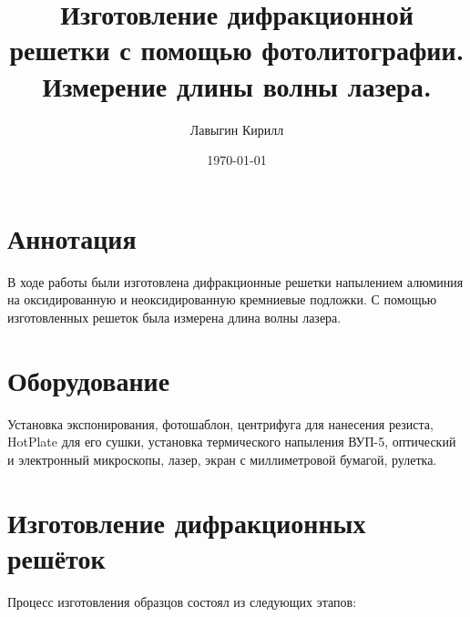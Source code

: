 \documentclass[a4paper,12pt]{article}
\title{\textbf{Изготовление дифракционной решетки с помощью
фотолитографии. Измерение длины волны лазера.}}
\author{Лавыгин Кирилл}
\date{\today}
\begin{document}
	
	\maketitle
	
	\section*{Аннотация}
	В ходе работы были изготовлена дифракционные решетки напылением алюминия на оксидированную и неоксидированную кремниевые подложки. С помощью изготовленных решеток была измерена длина волны лазера.

\section*{Оборудование}
Установка экспонирования, фотошаблон, центрифуга для нанесения резиста, HotPlate для его сушки, установка термического напыления ВУП-5, оптический и электронный микроскопы, лазер, экран с миллиметровой бумагой, рулетка.

\section*{Изготовление дифракционных решёток}
Процесс изготовления образцов состоял из следующих этапов:
\end{document}
